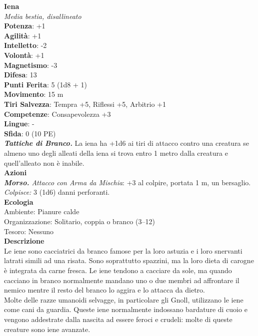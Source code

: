 \begin{multicols}{2}
\medskip\textbf{Iena}\\
\emph{Media bestia, disallineato}\\
\textbf{Potenza}: +1\\
\textbf{Agilità}: +1\\
\textbf{Intelletto}: -2\\
\textbf{Volontà}: +1\\
\textbf{Magnetismo}: -3\\
\textbf{Difesa}: 13\\
\textbf{Punti Ferita}: 5 (1d8 + 1)\\
\textbf{Movimento}: 15 m\\
\textbf{Tiri Salvezza}: Tempra +5, Riflessi +5, Arbitrio +1 \\
\textbf{Competenze}: Consapevolezza +3\\
\textbf{Lingue}: -\\
\textbf{Sfida}: 0 (10 PE)\smallskip\\
\emph{\textbf{Tattiche di Branco.}} La iena ha +1d6 ai tiri di attacco contro una creatura se almeno uno degli alleati della iena si trova entro 1 metro dalla creatura e quell'alleato non è inabile.\\
\smallskip\textbf{Azioni}\\
\emph{\textbf{Morso.} Attacco con Arma da Mischia}: +3 al colpire, portata 1 m, un bersaglio.\\
\emph{Colpisce:} 3 (1d6) danni perforanti.\\
\textbf{Ecologia}\\
Ambiente: Pianure calde\\
Organizzazione: Solitario, coppia o branco (3–12)\\
Tesoro: Nessuno\\
\textbf{Descrizione}\\

Le iene sono cacciatrici da branco famose per la loro astuzia e i loro snervanti latrati simili ad una risata. Sono soprattutto spazzini, ma la loro dieta di carogne è integrata da carne fresca. Le iene tendono a cacciare da sole, ma quando cacciano in branco normalmente mandano uno o due membri ad affrontare il nemico mentre il resto del branco lo aggira e lo attacca da dietro.\\

Molte delle razze umanoidi selvagge, in particolare gli Gnoll, utilizzano le iene come cani da guardia. Queste iene normalmente indossano bardature di cuoio e vengono addestrate dalla nascita ad essere feroci e crudeli: molte di queste creature sono iene avanzate. \\



\end{multicols}
